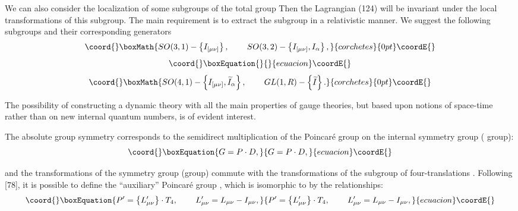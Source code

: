 \documentclass[a4paper,12pt]{article}
\begin{document}
We can also consider the localization of some subgroups of the
total group \coordHE{} Then the Lagrangian (124) will be
invariant under the local transformations of this subgroup. The
main requirement is to extract the subgroup in a relativistic
manner. We suggest the following subgroups and their corresponding
generators
\[\coord{}\boxMath{
SO(3,1)-\left\{ I_{[\mu \nu ]}\right\}
,\hspace{0.3in}SO(3,2)-\left\{ I_{[\mu \nu ]},I_\alpha \right\} ,
}{corchetes}{0pt}\coordE{}\]
\vspace{-8mm}
\begin{equation}\coord{}\boxEquation{  \label{132}
}{  }{ecuacion}\coordE{}\end{equation}
\vspace{-8mm}
\[\coord{}\boxMath{
SO(4,1)-\left\{ I_{[\mu \nu ]},\widetilde{I}_\alpha \right\} ,
\hspace{0.3in} GL(1,R)-\left\{ \widetilde{I}\right\} .
}{corchetes}{0pt}\coordE{}\]

The possibility of constructing a dynamic theory with all the main
properties of gauge theories, but based upon notions of space-time rather
than on new internal quantum numbers, is of evident interest.

The absolute group symmetry \coordHE{} corresponds to the semidirect multiplication
of the Poincar\'e group \coordHE{} on the internal symmetry group \coordHE{} (\coordHE{}
group):
\begin{equation}\coord{}\boxEquation{
G=P\cdot D  ,\label{133}
}{
G=P\cdot D  ,}{ecuacion}\coordE{}\end{equation}

and the transformations of the symmetry group (\coordHE{}group) commute
with the transformations of the subgroup of four-translations
\coordHE{}. Following [78], it is possible to define the ``auxiliary''
Poincar\'e group \coordHE{}, which is isomorphic to \coordHE{} by the
relationships:
\begin{equation}\coord{}\boxEquation{
P^{\prime }=\left\{ L_{\mu \nu }^{\prime }\right\} \cdot T_4 ,
\hspace{0.3in} L_{\mu \nu }^{\prime }=L_{\mu \nu }-I_{\mu \nu } ,
\label{134}
}{
P^{\prime }=\left\{ L_{\mu \nu }^{\prime }\right\} \cdot T_4 ,
\hspace{0.3in} L_{\mu \nu }^{\prime }=L_{\mu \nu }-I_{\mu \nu } ,
}{ecuacion}\coordE{}\end{equation}
\end{document}
